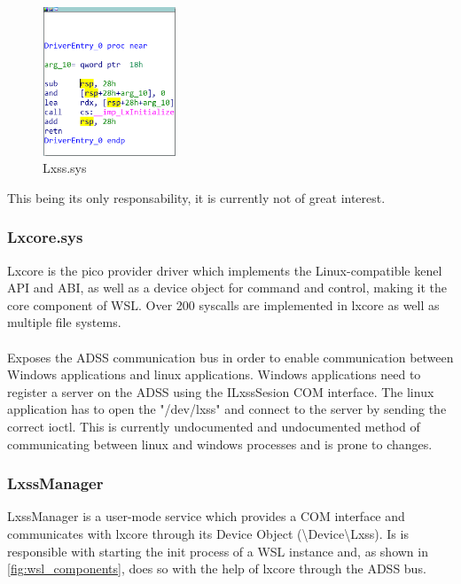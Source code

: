             \begin{figure}[H]
                \centering
                \includegraphics[width=150px, keepaspectratio]{img/lxss.png}
                \caption{Lxss.sys}
                \label{fig:lxss}
            \end{figure}

            This being its only responsability, it is currently not of great interest.
            
            \subsubsection{Lxcore.sys}
            Lxcore is the pico provider driver which implements the Linux-compatible kenel API and ABI, as well as a device object for command
            and control\cite{Bluehat2016AI}, making it the core component of WSL. Over 200 syscalls are implemented in lxcore as well as
            multiple file systems.

            \paragraph{}
            Exposes the ADSS communication bus in order to enable communication between Windows applications and linux applications. Windows
            applications need to register a server on the ADSS using the ILxssSesion COM interface. The linux application has to open the
            "/dev/lxss" and connect to the server by sending the correct ioctl. This is currently undocumented and undocumented
            method of communicating between linux and windows processes and is prone to changes.

            \subsubsection{LxssManager}
            LxssManager is a user-mode service which provides a COM interface and communicates with lxcore through its Device Object
            (\textbackslash Device\textbackslash Lxss). Is is responsible with starting the init process of a WSL instance and, as shown
            in \ref{fig:wsl_components}, does so with the help of lxcore through the ADSS bus.

